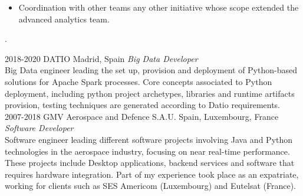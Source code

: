 \documentclass[]{friggeri-cv}
\begin{document}
\begin{entrylist}
{\begin{itemize}
  \item Coordination with other teams any other initiative whose scope extended the advanced analytics team.
\end{itemize}.}
\entry
{2018-2020}
{DATIO}
{Madrid, Spain}
{\emph{Big Data Developer} \\
Big Data engineer leading the set up, provision and deployment of Python-based solutions for Apache Spark processes.
Core concepts associated to Python deployment, including python project archetypes, libraries and runtime artifacts provision, testing techniques are
generated according to Datio requirements.}
\entry
{2007-2018}
{GMV Aerospace and Defence S.A.U.}
{Spain, Luxembourg, France}
{\emph{Software Developer} \\
Software engineer leading different software projects involving Java and Python technologies in the aerospace industry, focusing on near real-time performance.
These projects include Desktop applications, backend services and software that requires hardware integration.
Part of my experience took place as an expatriate, working for clients such as SES Americom (Luxembourg) and Eutelsat (France).}
\end{entrylist}
\end{document}
